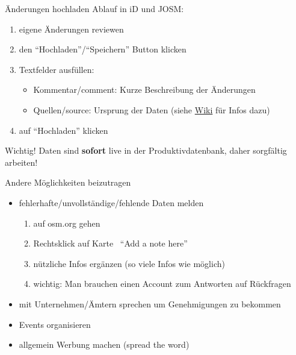 \documentclass{beamer}
\begin{document}
			\begin{frame}{Änderungen hochladen}
				Ablauf in iD und JOSM:
				\begin{enumerate}
					\item eigene Änderungen reviewen\pause
					\item den \enquote{Hochladen}/\enquote{Speichern} Button klicken\pause
					\item Textfelder ausfüllen:
					\begin{itemize}
						\item Kommentar/comment: Kurze Beschreibung der Änderungen
						\item Quellen/source: Ursprung der Daten (siehe \href{https://wiki.openstreetmap.org/wiki/Key:source}{Wiki} für Infos dazu)
					\end{itemize}\pause
					\item auf \enquote{Hochladen} klicken
				\end{enumerate}
				\pause
				\vspace{0.25cm}
				{
					\begin{block}{Wichtig!}
						Daten sind \textbf{sofort} live in der Produktivdatenbank, daher sorgfältig arbeiten!
					\end{block}
				}
			\end{frame}
			
			\begin{frame}{Andere Möglichkeiten beizutragen}
				\begin{itemize}
					\item fehlerhafte/unvollständige/fehlende Daten melden
					\begin{enumerate}
						\item auf osm.org gehen
						\item Rechtsklick auf Karte \textrightarrow\ \enquote{Add a note here}
						\item nützliche Infos ergänzen (so viele Infos wie möglich)
						\item wichtig: Man brauchen einen Account zum Antworten auf Rückfragen
					\end{enumerate}\pause
					\item mit Unternehmen/Ämtern sprechen um Genehmigungen zu bekommen\pause
					\item Events organisieren\pause
					\item allgemein Werbung machen (spread the word)
				\end{itemize}
			\end{frame}
\end{document}
